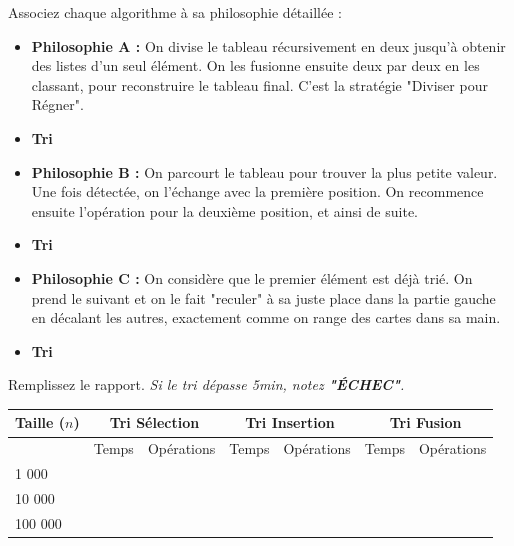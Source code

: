 \documentclass[12pt,a4paper]{report}
\begin{document}
\begin{Exercise}[title={Étude des Philosophies de Tri}]
    \Question  Associez chaque algorithme à sa philosophie détaillée :
    
    \begin{itemize}
        \item \textbf{Philosophie A :} On divise le tableau récursivement en deux jusqu'à obtenir des listes d'un seul élément. On les fusionne ensuite deux par deux en les classant, pour reconstruire le tableau final. C'est la stratégie "Diviser pour Régner".
        \item \textbf{Tri} \dotfill 
        \item \textbf{Philosophie B :} On parcourt le tableau pour trouver la plus petite valeur. Une fois détectée, on l'échange avec la première position. On recommence ensuite l'opération pour la deuxième position, et ainsi de suite.
        \item \textbf{Tri} \dotfill 
        \item \textbf{Philosophie C :} On considère que le premier élément est déjà trié. On prend le suivant et on le fait "reculer" à sa juste place dans la partie gauche en décalant les autres, exactement comme on range des cartes dans sa main.
        \item \textbf{Tri} \dotfill 
    \end{itemize}
\end{Exercise}

\begin{Exercise}[title={Crash Test des Serveurs}]
    \Question Remplissez le rapport. \textit{Si le tri dépasse 5min, notez \textbf{"ÉCHEC"}.}
    \begin{center}
    \begin{tabular}{|l|c|c|c|c|c|c|}
    \hline
    Taille ($n$) & \multicolumn{2}{c|}{Tri Sélection } & \multicolumn{2}{c|}{Tri Insertion } & \multicolumn{2}{c|}{Tri Fusion } \\ \hline
    & Temps & Opérations & Temps & Opérations & Temps & Opérations \\ \hline
    1 000 & & & & & & \\ \hline
    10 000 & & & & & & \\ \hline
    100 000 & & & & & & \\ \hline
    \end{tabular}
    \end{center}
\end{Exercise}
\end{document}
